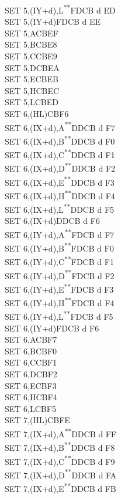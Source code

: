 \documentclass[12pt,twoside,openright,a4paper]{book}
\newcommand{\UNDOC}{\textnormal{\textsuperscript{**}}}
\begin{document}
\begin{multicols}{3}
{\begin{tabbing}
	SET 5,(IY+d),L\UNDOC\>FDCB d ED\\
	SET 5,(IY+d)\>FDCB d EE\\
	SET 5,A\>CBEF\\
	SET 5,B\>CBE8\\
	SET 5,C\>CBE9\\
	SET 5,D\>CBEA\\
	SET 5,E\>CBEB\\
	SET 5,H\>CBEC\\
	SET 5,L\>CBED\\
	SET 6,(HL)\>CBF6\\
	SET 6,(IX+d),A\UNDOC\>DDCB d F7\\
	SET 6,(IX+d),B\UNDOC\>DDCB d F0\\
	SET 6,(IX+d),C\UNDOC\>DDCB d F1\\
	SET 6,(IX+d),D\UNDOC\>DDCB d F2\\
	SET 6,(IX+d),E\UNDOC\>DDCB d F3\\
	SET 6,(IX+d),H\UNDOC\>DDCB d F4\\
	SET 6,(IX+d),L\UNDOC\>DDCB d F5\\
	SET 6,(IX+d)\>DDCB d F6\\
	SET 6,(IY+d),A\UNDOC\>FDCB d F7\\
	SET 6,(IY+d),B\UNDOC\>FDCB d F0\\
	SET 6,(IY+d),C\UNDOC\>FDCB d F1\\
	SET 6,(IY+d),D\UNDOC\>FDCB d F2\\
	SET 6,(IY+d),E\UNDOC\>FDCB d F3\\
	SET 6,(IY+d),H\UNDOC\>FDCB d F4\\
	SET 6,(IY+d),L\UNDOC\>FDCB d F5\\
	SET 6,(IY+d)\>FDCB d F6\\
	SET 6,A\>CBF7\\
	SET 6,B\>CBF0\\
	SET 6,C\>CBF1\\
	SET 6,D\>CBF2\\
	SET 6,E\>CBF3\\
	SET 6,H\>CBF4\\
	SET 6,L\>CBF5\\
	SET 7,(HL)\>CBFE\\
	SET 7,(IX+d),A\UNDOC\>DDCB d FF\\
	SET 7,(IX+d),B\UNDOC\>DDCB d F8\\
	SET 7,(IX+d),C\UNDOC\>DDCB d F9\\
	SET 7,(IX+d),D\UNDOC\>DDCB d FA\\
	SET 7,(IX+d),E\UNDOC\>DDCB d FB\\

\end{tabbing}}
\end{multicols}
\end{document}
